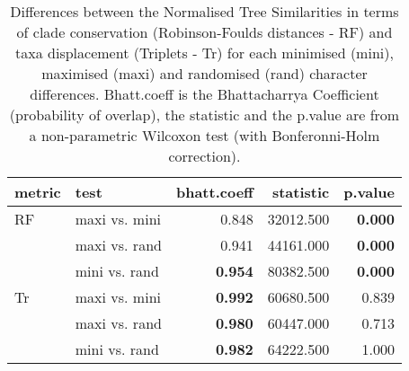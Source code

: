\begin{table}[ht]
\centering
\begin{tabular}{llr|rr}
  \hline
metric & test & bhatt.coeff & statistic & p.value \\ 
  \hline
RF & maxi vs. mini & 0.848 & 32012.500 & \textbf{0.000} \\ 
   & maxi vs. rand & 0.941 & 44161.000 & \textbf{0.000} \\ 
   & mini vs. rand & \textbf{0.954} & 80382.500 & \textbf{0.000} \\ 
  Tr & maxi vs. mini & \textbf{0.992} & 60680.500 & 0.839 \\ 
   & maxi vs. rand & \textbf{0.980} & 60447.000 & 0.713 \\ 
   & mini vs. rand & \textbf{0.982} & 64222.500 & 1.000 \\ 
   \hline
\end{tabular}
\caption{Differences between the Normalised Tree Similarities in terms of clade conservation (Robinson-Foulds distances - RF) and taxa displacement (Triplets - Tr) for each minimised (mini), maximised (maxi) and randomised (rand) character differences. Bhatt.coeff is the Bhattacharrya Coefficient (probability of overlap), the statistic and the p.value are from a non-parametric Wilcoxon test (with Bonferonni-Holm correction).} 
\label{Tab_pooledscenarios_test}
\end{table}
